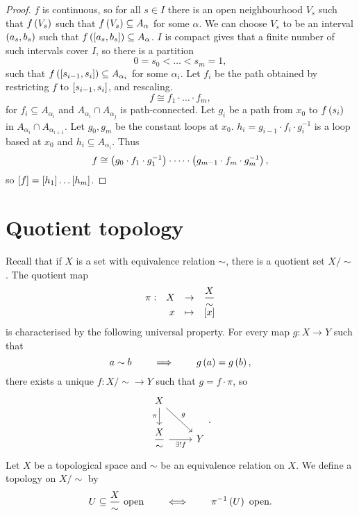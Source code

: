 \begin{proof}
$ f $ is continuous, so for all $ s \in I $ there is an open neighbourhood $ V_s $ such that $ f\rb{V_s} $ such that $ f\rb{V_s} \subseteq A_\alpha $ for some $ \alpha $. We can choose $ V_s $ to be an interval $ \rb{a_s, b_s} $ such that $ f\rb{\sb{a_s, b_s}} \subseteq A_\alpha $. $ I $ is compact gives that a finite number of such intervals cover $ I $, so there is a partition
$$ 0 = s_0 < \dots < s_m = 1, $$
such that $ f\rb{\sb{s_{i - 1}, s_i}} \subseteq A_{\alpha_i} $ for some $ \alpha_i $. Let $ f_i $ be the path obtained by restricting $ f $ to $ \sb{s_{i - 1}, s_i} $, and rescaling.
$$ f \cong f_1 \cdot \dots \cdot f_m, $$
for $ f_i \subseteq A_{\alpha_i} $ and $ A_{\alpha_i} \cap A_{\alpha_j} $ is path-connected. Let $ g_i $ be a path from $ x_0 $ to $ f\rb{s_i} $ in $ A_{\alpha_i} \cap A_{\alpha_{i + 1}} $. Let $ g_0, g_m $ be the constant loops at $ x_0 $. $ h_i = g_{i - 1} \cdot f_i \cdot g_i^{-1} $ is a loop based at $ x_0 $ and $ h_i \subseteq A_{\alpha_i} $. Thus
$$ f \cong \rb{g_0 \cdot f_1 \cdot g_1^{-1}} \cdot \dots \cdot \rb{g_{m - 1} \cdot f_m \cdot g_m^{-1}}, $$
so $ \sb{f} = \sb{h_1} \dots \sb{h_m} $.
\end{proof}

\pagebreak

\appendix

\section{Quotient topology}

Recall that if $ X $ is a set with equivalence relation $ \sim $, there is a quotient set $ X / \sim $. The quotient map
$$ \function[\pi]{X}{\dfrac{X}{\sim}}{x}{\sb{x}} $$
is characterised by the following universal property. For every map $ g : X \to Y $ such that
$$ a \sim b \qquad \implies \qquad g\rb{a} = g\rb{b}, $$
there exists a unique $ f : X / \sim \to Y $ such that $ g = f \cdot \pi $, so
$$
\begin{tikzcd}
X \arrow{dr}{g} \arrow[swap]{d}{\pi} & \\
\dfrac{X}{\sim} \arrow[swap]{r}{\exists !f} & Y
\end{tikzcd}.
$$
Let $ X $ be a topological space and $ \sim $ be an equivalence relation on $ X $. We define a topology on $ X / \sim $ by
$$ U \subseteq \dfrac{X}{\sim} \ \text{open} \qquad \iff \qquad \pi^{-1}\rb{U} \ \text{open}. $$

